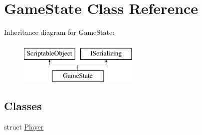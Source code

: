 \hypertarget{class_game_state}{\section{Game\-State Class Reference}
\label{class_game_state}
}
Inheritance diagram for Game\-State\-:\begin{figure}[H]
\begin{center}
\leavevmode
\includegraphics[height=2.000000cm]{class_game_state}
\end{center}
\end{figure}
\subsection*{Classes}
\begin{DoxyCompactItemize}
\item 
struct \hyperlink{struct_game_state_1_1_player}{Player}
\end{DoxyCompactItemize}
